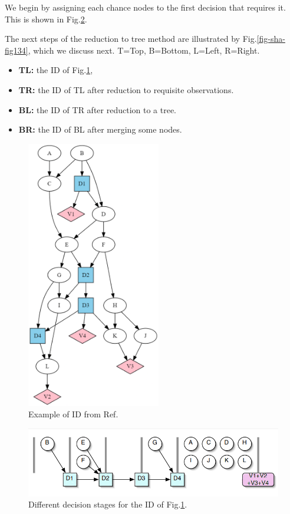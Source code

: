 \begin{itemize}
We begin by assigning each  chance nodes to
the first decision that requires it. This is shown 
in Fig.\ref{fig-jensen-stages}.


The next steps of the reduction to tree
method are illustrated by Fig.\ref{fig-sha-fig134},
which we discuss next.
T=Top, B=Bottom, L=Left, R=Right. 
\begin{itemize}
\item{\bf TL:} the ID of Fig.\ref{fig-sha-fig1},
\item{\bf TR:} the ID of TL after reduction to requisite
observations. 
\item{\bf BL:} the ID of TR after reduction to a tree.
\item {\bf BR:} the ID of BL after merging some nodes.
\end{itemize}


\begin{figure}[h!]
\centering
\includegraphics[width=2.3in]{influ-diag/sha-fig1.png}
\caption{Example of ID from Ref.\cite{sha-influ-diag}}
\label{fig-sha-fig1}
\end{figure}


\begin{figure}[h!]
\centering
\includegraphics[width=6in]
{influ-diag/influ-diag-stages.jpg}
\caption{Different decision stages for the ID of Fig.\ref{fig-sha-fig1}.}
\label{fig-jensen-stages}
\end{figure}


\end{itemize}
